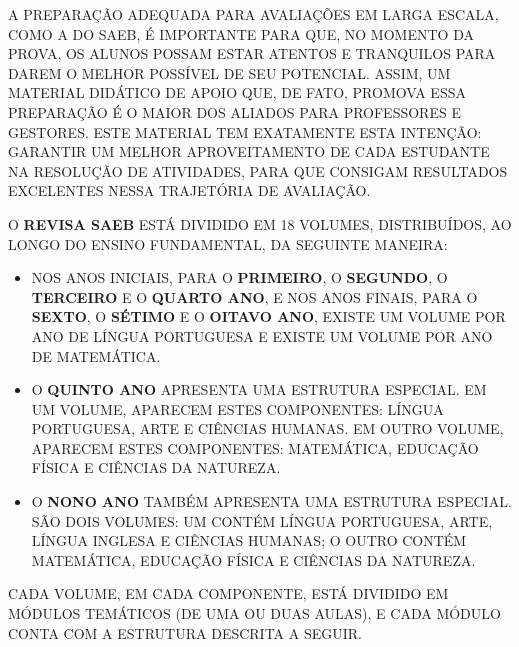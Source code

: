 A PREPARAÇÃO ADEQUADA PARA AVALIAÇÕES EM LARGA ESCALA, COMO A DO SAEB, É
IMPORTANTE PARA QUE, NO MOMENTO DA PROVA, OS ALUNOS POSSAM ESTAR ATENTOS
E TRANQUILOS PARA DAREM O MELHOR POSSÍVEL DE SEU POTENCIAL. ASSIM, UM
MATERIAL DIDÁTICO DE APOIO QUE, DE FATO, PROMOVA ESSA PREPARAÇÃO É O
MAIOR DOS ALIADOS PARA PROFESSORES E GESTORES. ESTE MATERIAL TEM
EXATAMENTE ESTA INTENÇÃO: GARANTIR UM MELHOR APROVEITAMENTO DE CADA
ESTUDANTE NA RESOLUÇÃO DE ATIVIDADES, PARA QUE CONSIGAM RESULTADOS
EXCELENTES NESSA TRAJETÓRIA DE AVALIAÇÃO.

O \textbf{REVISA SAEB} ESTÁ DIVIDIDO EM 18 VOLUMES, DISTRIBUÍDOS, AO
LONGO DO ENSINO FUNDAMENTAL, DA SEGUINTE MANEIRA:

\begin{itemize}
\item
  NOS ANOS INICIAIS, PARA O \textbf{PRIMEIRO}, O \textbf{SEGUNDO}, O
  \textbf{TERCEIRO} E O \textbf{QUARTO ANO}, E NOS ANOS FINAIS, PARA O
  \textbf{SEXTO}, O \textbf{SÉTIMO} E O \textbf{OITAVO ANO}, EXISTE UM
  VOLUME POR ANO DE LÍNGUA PORTUGUESA E EXISTE UM VOLUME POR ANO DE
  MATEMÁTICA.
\item
  O \textbf{QUINTO ANO} APRESENTA UMA ESTRUTURA ESPECIAL. EM UM VOLUME,
  APARECEM ESTES COMPONENTES: LÍNGUA PORTUGUESA, ARTE E CIÊNCIAS
  HUMANAS. EM OUTRO VOLUME, APARECEM ESTES COMPONENTES: MATEMÁTICA,
  EDUCAÇÃO FÍSICA E CIÊNCIAS DA NATUREZA.
\item
  O \textbf{NONO ANO} TAMBÉM APRESENTA UMA ESTRUTURA ESPECIAL. SÃO DOIS
  VOLUMES: UM CONTÉM LÍNGUA PORTUGUESA, ARTE, LÍNGUA INGLESA E CIÊNCIAS
  HUMANAS; O OUTRO CONTÉM MATEMÁTICA, EDUCAÇÃO FÍSICA E CIÊNCIAS DA
  NATUREZA.
\end{itemize}

CADA VOLUME, EM CADA COMPONENTE, ESTÁ DIVIDIDO EM MÓDULOS TEMÁTICOS (DE
UMA OU DUAS AULAS), E CADA MÓDULO CONTA COM A ESTRUTURA DESCRITA A
SEGUIR.

